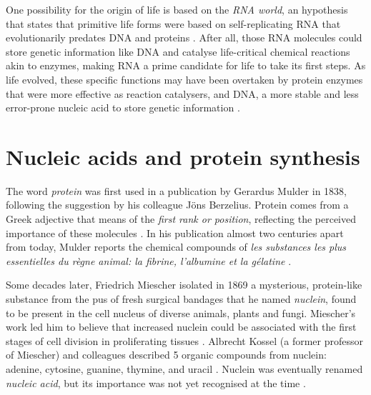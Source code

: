 One possibility for the origin of life is based on the \emph{RNA world}, an hypothesis that states that primitive life forms were based on self-replicating RNA that evolutionarily predates DNA and proteins \cite{gilbert:1986td,alberts:2008vj,sharp:1985th}. After all, those RNA molecules could store genetic information like DNA and catalyse life-critical chemical reactions akin to enzymes, making RNA a prime candidate for life to take its first steps. As life evolved, these specific functions may have been overtaken by protein enzymes that were more effective as reaction catalysers, and DNA, a more stable and less error-prone nucleic acid to store genetic information \cite{gilbert:1986td,alberts:2008vj}.





\section{Nucleic acids and protein synthesis}

The word \emph{protein} was first used in a publication by Gerardus Mulder in 1838, following the suggestion by his colleague Jöns Berzelius. Protein comes from a Greek adjective that means of the \emph{first rank or position}, reflecting the perceived importance of these molecules \cite{mulder:1838uy,vickery:1950ur}. In his publication almost two centuries apart from today, Mulder reports the chemical compounds of \emph{les substances les plus essentielles du règne animal: la fibrine, l'albumine et la gélatine} \cite{mulder:1838uy}. %


Some decades later, Friedrich Miescher isolated in 1869 a mysterious, protein-like substance from the pus of fresh surgical bandages that he named \emph{nuclein}, found to be present in the cell nucleus of diverse animals, plants and fungi. Miescher's work led him to believe that increased nuclein could be associated with the first stages of cell division in proliferating tissues \cite{dahm:2005wx}. Albrecht Kossel (a former professor of Miescher) and colleagues described 5 organic compounds from nuclein: adenine, cytosine, guanine, thymine, and uracil \cite{kossel:1885tj,kossel:1893ws,kossel:1894vy,ascoli:1901ti}. Nuclein was eventually renamed \emph{nucleic acid}, but its importance was not yet recognised at the time \cite{dahm:2005wx}.

